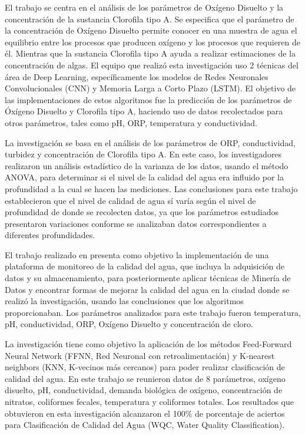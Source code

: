 El trabajo \cite{barzegar_short-term_2020} se centra en el análisis de los 
parámetros de Oxígeno Disuelto y la concentración de la sustancia Clorofila tipo A.
Se especifica que el parámetro de la concentración de Oxígeno Disuelto permite
conocer en una muestra de agua el equilibrio entre los procesos que producen
oxígeno y los procesos que requieren de él. Mientras que la sustancia Clorofila 
tipo A ayuda a realizar estimaciones de la concentración de algas.
El equipo que realizó esta investigación uso 2 técnicas del área de Deep Learning,
específicamente los modelos de Redes Neuronales Convolucionales (CNN) y Memoria
Larga a Corto Plazo (LSTM). El objetivo de las implementaciones de estos
algoritmos fue la predicción de los parámetros de Óxígeno Disuelto y Clorofila tipo 
A, haciendo uso de datos recolectados para otros parámetros, tales como pH, ORP,
temperatura y conductividad.

La investigación \cite{zhang_characterization_2015} se basa en el análisis de los
parámetros de ORP, conductividad, turbidez y concentración de Clorofila tipo A. En 
este caso, los investigadores realizaron un análisis estadístico de la varianza de 
los datos, usando el método ANOVA, para determinar si el nivel de la calidad del 
agua era influido por la profundidad a la cual se hacen las mediciones. Las 
conclusiones para este trabajo establecieron que el nivel de calidad de agua sí 
varía según el nivel de profundidad de donde se recolecten datos, ya que los 
parámetros estudiados presentaron variaciones conforme se analizaban datos 
correspondientes a diferentes profundidades.

El trabajo realizado en \cite{saetta_datamining_2021} presenta como objetivo 
la implementación de una plataforma de monitoreo de la calidad del agua, que incluya
la adquisición de datos y su almacenamiento, para posteriormente aplicar técnicas de
Minería de Datos y encontrar formas de mejorar la calidad del agua en la ciudad 
donde se realizó la investigación, usando las conclusiones que los algoritmos 
proporcionaban. Los parámetros analizados para este trabajo fueron temperatura, pH,
conductividad, ORP, Oxígeno Disuelto y concentración de cloro. 

La investigación \cite{hmoud_al-adhaileh_modelling_2021} tiene como objetivo la aplicación de los métodos Feed-Forward Neural Network (FFNN, Red Neuronal con retroalimentación) y 
K-nearest neighbors (KNN, K-vecinos más cercanos) para poder realizar clasificación de calidad del agua. En este trabajo se reunieron datos de 8 parámetros, 
oxígeno disuelto, pH, conductividad, demanda biológica de oxígeno, concentración de nitratos, coliformes fecales, temperatura y coliformes totales. Los resultados que obtuvieron 
en esta investigación alcanzaron el 100\% de porcentaje de aciertos para Clasificación de Calidad del Agua (WQC, Water Quality Classification). 

